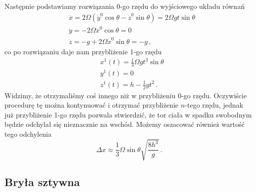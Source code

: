 \documentclass[../main.tex]{subfiles}
\begin{document}
Następnie podstawiamy rozwiązania 0-go rzędu do wyjściowego układu równań
\begin{equation*}
    \begin{split}
        &\ddot{x}=2\Omega (\dot{y}^0\cos\theta-\dot{z}^0\sin\theta)=2\Omega gt\sin\theta\\
        &\ddot y=-2\Omega \dot{x}^0\cos\theta=0\\
        &\ddot z=-g+2\Omega \dot{x}^0\sin\theta=-g\,,
    \end{split}
\end{equation*}
co po rozwiązaniu daje nam przybliżenie 1-go rzędu
\begin{equation*}
    \begin{split}
        &x^1(t)=\frac{1}{3}\Omega gt^3\sin\theta\\
        &y^1(t)=0\\
        &z^1(t)=h-\frac{1}{2}gt^2\,.
    \end{split}
\end{equation*}
Widzimy, że otrzymaliśmy coś innego niż w przybliżeniu 0-go rzędu. Oczywiście procedurę tę można kontynuować i otrzymać przybliżenie \(n\)-tego rzędu, jednak już przybliżenie 1-go rzędu pozwala stwierdzić, że tor ciała w spadku swobodnym będzie odchylał się nieznacznie na wschód. Możemy oszacować również wartość tego odchylenia
\begin{equation*}
    \Delta x\approx\frac{1}{3}\Omega \sin\theta \sqrt{\frac{8h^3}{g}}\,.
\end{equation*}

\subsection{Bryła sztywna}
\end{document}

